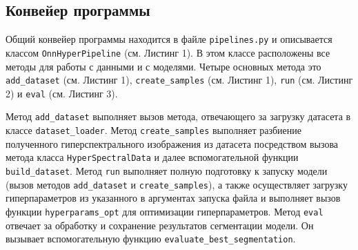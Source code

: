 \documentclass[14pt, russian]{scrartcl}
\begin{document}
\subsection{Конвейер программы}

Общий конвейер программы находится в файле \texttt{pipelines.py} и описывается классом \texttt{OnnHyperPipeline} (см. Листинг 1). В этом классе расположены все методы для работы с данными и 
с моделями. Четыре основных метода это \texttt{add\_dataset} (см. Листинг 1), \texttt{create\_samples} (см. Листинг 1), \texttt{run} (см. Листинг 2) и \texttt{eval} (см. Листинг 3).

Метод \texttt{add\_dataset} выполняет вызов метода, отвечающего за загрузку датасета в классе \texttt{dataset\_loader}. Метод \texttt{create\_samples} выполняет разбиение полученного 
гиперспектрального изображения из датасета посредством вызова метода класса \texttt{HyperSpectralData} и далее вспомогательной функции \texttt{build\_dataset}. 
Метод \texttt{run} выполняет полную подготовку к запуску модели (вызов методов \texttt{add\_dataset} и \texttt{create\_samples}), а также осуществляет загрузку гиперпараметров из указанного 
в аргументах запуска файла и выполняет вызов функции \texttt{hyperparams\_opt} для оптимизации гиперпараметров.
Метод \texttt{eval} отвечает за обработку и сохранение результатов сегментации модели. Он вызывает вспомогательную функцию \texttt{evaluate\_best\_segmentation}.
\end{document}
